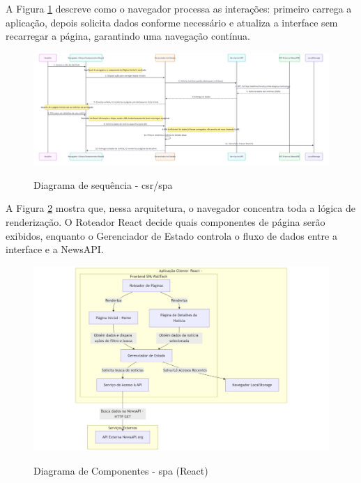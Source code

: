 A Figura \ref{fig:sequence-diagram-csr} descreve como o navegador processa as interações: primeiro carrega a aplicação, depois solicita dados conforme necessário e atualiza a interface sem recarregar a página, garantindo uma navegação contínua.

\begin{figure}[H]
  \centering
  \caption{Diagrama de sequência - \acrshort{csr}/\acrshort{spa}}
  \includegraphics[width=1\textwidth]{media/wall_tech_detail_sequence_diagram.jpeg}
  \label{fig:sequence-diagram-csr}
\end{figure}


A Figura \ref{fig:component-diagram-react} mostra que, nessa arquitetura, o navegador concentra toda a lógica de renderização. O Roteador React decide quais componentes de página serão exibidos, enquanto o Gerenciador de Estado controla o fluxo de dados entre a interface e a NewsAPI.

\begin{figure}[H]
  \centering
  \caption{Diagrama de Componentes - \acrshort{spa} (React)}
  \includegraphics[width=1\textwidth]{media/component-diagram-react.jpeg}
  \label{fig:component-diagram-react}
\end{figure}



